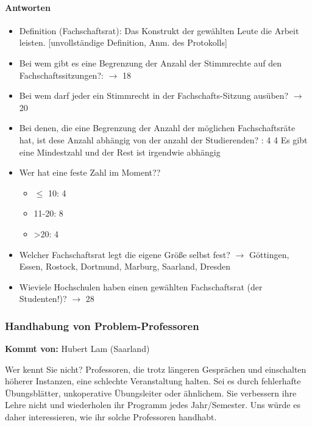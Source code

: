       \paragraph{Antworten}
        \begin{itemize}
          \item Definition (Fachschaftsrat): Das Konstrukt der gewählten Leute die Arbeit leisten. [unvollständige Definition, Anm. des Protokolls]
          \item Bei wem gibt es eine Begrenzung der Anzahl der Stimmrechte auf den Fachschaftssitzungen?: $\rightarrow$ 18
          \item Bei wem darf jeder ein Stimmrecht in der Fachschafts-Sitzung ausüben? $\rightarrow$ 20
          \item Bei denen, die eine Begrenzung der Anzahl der möglichen Fachschaftsräte hat, ist dese Anzahl abhängig von der anzahl der Studierenden? : 4
          4
          Es gibt eine Mindestzahl und der Rest ist irgendwie abhängig
          \item Wer hat eine feste Zahl im Moment??
            \begin{itemize}
              \item $\leq$ 10: 4 %
              \item 11-20: 8
              \item >20: 4
            \end{itemize}
          \item Welcher Fachschaftsrat legt die eigene Größe selbst fest? $\rightarrow$ Göttingen, Essen, Rostock, Dortmund, Marburg, Saarland, Dresden
          \item Wieviele Hochschulen haben einen gewählten Fachschaftsrat (der Studenten!)? $\rightarrow$ 28
        \end{itemize}

    \subsubsection*{Handhabung von Problem-Professoren}
      \textbf{Kommt von:} Hubert Lam (Saarland)

      Wer kennt Sie nicht? Professoren, die trotz längeren Gesprächen und einschalten höherer Instanzen, eine schlechte Veranstaltung halten. Sei es durch fehlerhafte Übungsblätter, unkoperative Übungsleiter oder ähnlichem. Sie verbessern ihre Lehre nicht und wiederholen ihr Programm jedes Jahr/Semester. Uns würde es daher interessieren, wie ihr solche Professoren handhabt. \\

